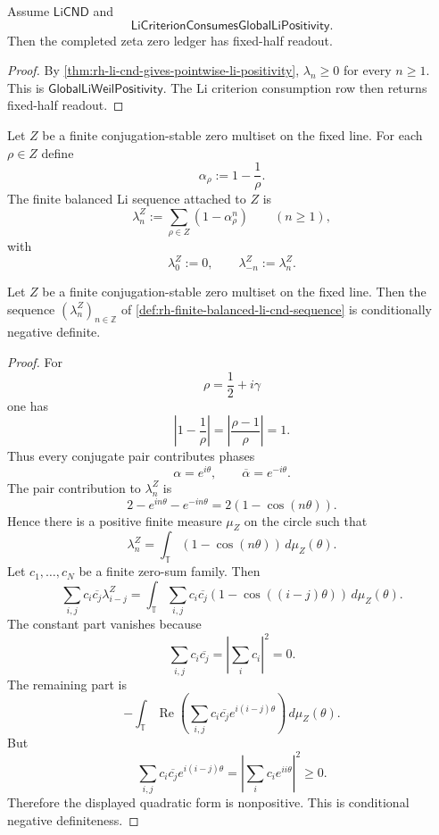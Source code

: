 \begin{corollary}
\label{cor:rh-li-cnd-fixed-half-readout}
Assume $\mathsf{LiCND}$ and
$$
\mathsf{LiCriterionConsumesGlobalLiPositivity}.
$$
Then the completed zeta zero ledger has fixed-half readout.
\end{corollary}

\begin{proof}
By \autoref{thm:rh-li-cnd-gives-pointwise-li-positivity},
$\lambda_n\ge0$ for every $n\ge1$.  This is
$\mathsf{GlobalLiWeilPositivity}$.  The Li criterion consumption row
then returns fixed-half readout.
\end{proof}

\begin{definition}
\label{def:rh-finite-balanced-li-cnd-sequence}
Let $Z$ be a finite conjugation-stable zero multiset on the fixed line.
For each $\rho\in Z$ define
$$
\alpha_\rho:=1-\frac1\rho.
$$
The finite balanced Li sequence attached to $Z$ is
$$
\lambda_n^Z
:=
\sum_{\rho\in Z}
\left(1-\alpha_\rho^n\right)
\qquad
(n\ge1),
$$
with
$$
\lambda_0^Z:=0,
\qquad
\lambda_{-n}^Z:=\lambda_n^Z.
$$
\end{definition}

\begin{theorem}
\label{thm:rh-balanced-critical-divisors-give-li-cnd}
Let $Z$ be a finite conjugation-stable zero multiset on the fixed line.
Then the sequence $(\lambda_n^Z)_{n\in\mathbb Z}$ of
\autoref{def:rh-finite-balanced-li-cnd-sequence} is conditionally
negative definite.
\end{theorem}

\begin{proof}
For
$$
\rho=\frac12+i\gamma
$$
one has
$$
\left|1-\frac1\rho\right|
=
\left|\frac{\rho-1}{\rho}\right|
=1.
$$
Thus every conjugate pair contributes phases
$$
\alpha=e^{i\theta},
\qquad
\overline{\alpha}=e^{-i\theta}.
$$
The pair contribution to $\lambda_n^Z$ is
$$
2-e^{in\theta}-e^{-in\theta}
=
2(1-\cos(n\theta)).
$$
Hence there is a positive finite measure $\mu_Z$ on the circle such that
$$
\lambda_n^Z
=
\int_{\mathbb T}
\left(1-\cos(n\theta)\right)\,d\mu_Z(\theta).
$$
Let $c_1,\ldots,c_N$ be a finite zero-sum family.  Then
$$
\sum_{i,j}c_i\overline{c_j}\lambda_{i-j}^Z
=
\int_{\mathbb T}
\sum_{i,j}c_i\overline{c_j}
\left(1-\cos((i-j)\theta)\right)
\,d\mu_Z(\theta).
$$
The constant part vanishes because
$$
\sum_{i,j}c_i\overline{c_j}
=
\left|\sum_i c_i\right|^2
=0.
$$
The remaining part is
$$
-
\int_{\mathbb T}
\operatorname{Re}
\left(
\sum_{i,j}c_i\overline{c_j}e^{i(i-j)\theta}
\right)
\,d\mu_Z(\theta).
$$
But
$$
\sum_{i,j}c_i\overline{c_j}e^{i(i-j)\theta}
=
\left|\sum_i c_i e^{ii\theta}\right|^2
\ge0.
$$
Therefore the displayed quadratic form is nonpositive.  This is
conditional negative definiteness.
\end{proof}


